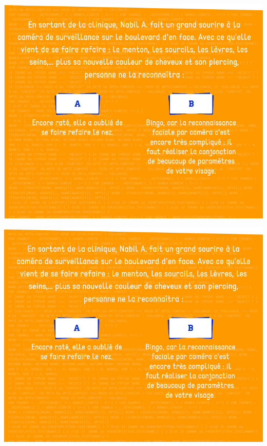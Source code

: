 \documentclass{beamer}
\begin{document}
\begin{frame}\includegraphics[scale=0.6] {./images/Quizz_HygieneNumerique_France4_36.jpg} \end{frame}
\begin{frame}\includegraphics[scale=0.6] {./images/Quizz_HygieneNumerique_France4_37.jpg} \end{frame}
\end{document}
